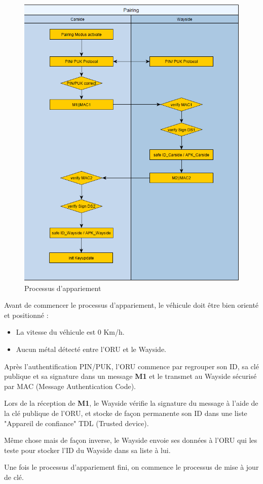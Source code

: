 \begin{figure}[H]
 \centering
 \includegraphics[scale=0.6]{images/pairing_process}
 \caption{Processus d'appariement}
\end{figure}

Avant de commencer le processus d'appariement, le véhicule doit être bien orienté et positionné : 

\begin{itemize}

	\item La vitesse du véhicule est 0 Km/h.
	\item Aucun métal détecté entre l'ORU et le Wayside.

\end{itemize}

Après l'authentification PIN/PUK, l'ORU commence par regrouper son ID, sa clé publique et sa signature dans un message \textbf{M1} et le transmet au Wayside sécurisé par MAC (Message Authentication Code).

Lors de la réception de \textbf{M1}, le Wayside vérifie la signature du message à l'aide de la clé publique de l'ORU, et stocke de façon permanente son ID dans une liste "Appareil de confiance" TDL (Trusted device).

Même chose mais de façon inverse, le Wayside envoie ses données à l'ORU qui les teste pour stocker l'ID du Wayside dans sa liste à lui.

Une fois le processus d'appariement fini, on commence le processus de mise à jour de clé.


